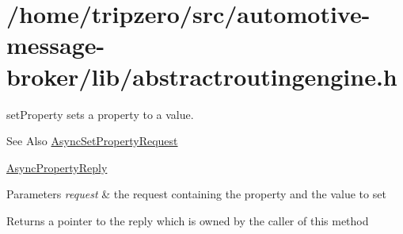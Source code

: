 \hypertarget{_2home_2tripzero_2src_2automotive-message-broker_2lib_2abstractroutingengine_8h-example}{\section{/home/tripzero/src/automotive-\/message-\/broker/lib/abstractroutingengine.\-h}
}
set\-Property sets a property to a value. \begin{DoxySeeAlso}{See Also}
\hyperlink{classAsyncSetPropertyRequest}{Async\-Set\-Property\-Request} 

\hyperlink{classAsyncPropertyReply}{Async\-Property\-Reply} 
\end{DoxySeeAlso}

\begin{DoxyParams}{Parameters}
{\em request} & the request containing the property and the value to set \\
\hline
\end{DoxyParams}
\begin{DoxyReturn}{Returns}
a pointer to the reply which is owned by the caller of this method
\end{DoxyReturn}

\begin{DoxyCodeInclude}
\end{DoxyCodeInclude}
 